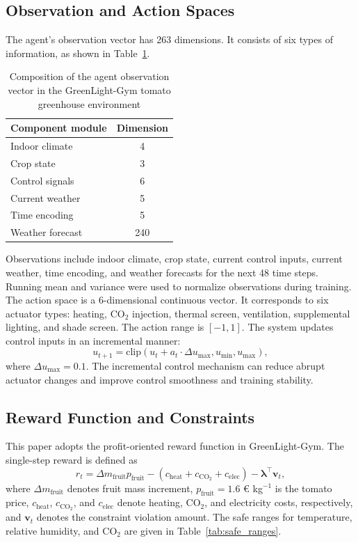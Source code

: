 \documentclass[number,preprint,review,12pt]{elsarticle}
\begin{document}
\subsection{Observation and Action Spaces}
The agent's observation vector has 263 dimensions. It consists of six types of information, as shown in Table~\ref{tab:state_space}.

\begin{table}[H]
\centering
\caption{Composition of the agent observation vector in the GreenLight-Gym tomato greenhouse environment}
\label{tab:state_space}
\begin{tabular}{lc}
\toprule
Component module & Dimension \\
\midrule
Indoor climate & 4 \\
Crop state & 3 \\
Control signals & 6 \\
Current weather & 5 \\
Time encoding & 5 \\
Weather forecast & 240 \\
\bottomrule
\end{tabular}
\end{table}

Observations include indoor climate, crop state, current control inputs, current weather, time encoding, and weather forecasts for the next 48 time steps. Running mean and variance were used to normalize observations during training. The action space is a 6-dimensional continuous vector. It corresponds to six actuator types: heating, CO$_2$ injection, thermal screen, ventilation, supplemental lighting, and shade screen. The action range is $[-1, 1]$. The system updates control inputs in an incremental manner:
\begin{equation}
u_{t+1} = \mathrm{clip}(u_t + a_t \cdot \Delta u_{\max}, u_{\min}, u_{\max}),
\end{equation}
where $\Delta u_{\max}=0.1$. The incremental control mechanism can reduce abrupt actuator changes and improve control smoothness and training stability.

\subsection{Reward Function and Constraints}
This paper adopts the profit-oriented reward function in GreenLight-Gym. The single-step reward is defined as
\begin{equation}
r_t = \Delta m_{\mathrm{fruit}} p_{\mathrm{fruit}} - (c_{\mathrm{heat}} + c_{\mathrm{CO}_2} + c_{\mathrm{elec}}) - \boldsymbol{\lambda}^{\top}\boldsymbol{v}_t,
\end{equation}
where $\Delta m_{\mathrm{fruit}}$ denotes fruit mass increment, $p_{\mathrm{fruit}}=1.6$ € kg$^{-1}$ is the tomato price, $c_{\mathrm{heat}}$, $c_{\mathrm{CO}_2}$, and $c_{\mathrm{elec}}$ denote heating, CO$_2$, and electricity costs, respectively, and $\boldsymbol{v}_t$ denotes the constraint violation amount. The safe ranges for temperature, relative humidity, and CO$_2$ are given in Table~\ref{tab:safe_ranges}.
\end{document}
